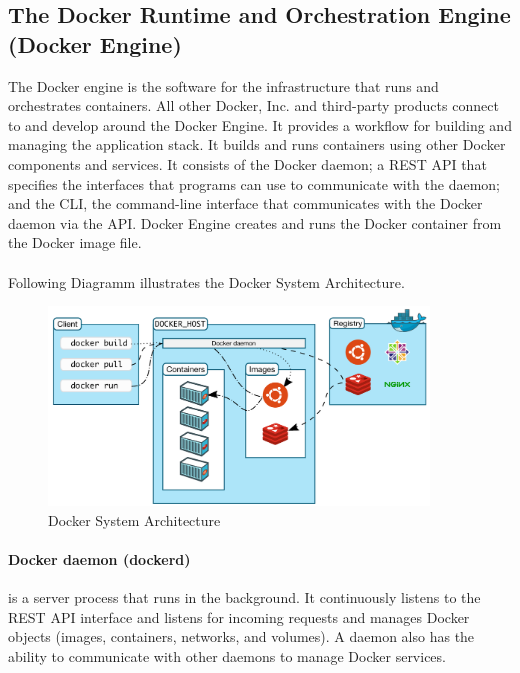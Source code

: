 		\subsection{The Docker Runtime and Orchestration Engine (Docker Engine)} 
		\label{Grundlagen:Docker:Docker Engine}
		The Docker engine is the software for the infrastructure that runs and orchestrates containers. All other Docker, Inc. and third-party products connect to and develop around the Docker Engine. It provides a workflow for building and managing the application stack. It builds and runs containers using other Docker components and services. It consists of the Docker daemon; a REST API that specifies the interfaces that programs can use to communicate with the daemon; and the CLI, the command-line interface that communicates with the Docker daemon via the API. Docker Engine creates and runs the Docker container from the Docker image file.\\
		\\
		Following Diagramm illustrates the Docker System Architecture.
		\begin{figure}[H]
			\centering
			\includegraphics[width=0.9\textwidth]{"Bilder/DockerArchitecture.png"}
			\caption{Docker System Architecture \cite{dockerOverwiew}}
			\label{fig:Background:DockerEngine:Architecture}					
		\end{figure}

		\paragraph{Docker daemon (dockerd)}  is a server process that runs
		in the background. It continuously listens to the REST API interface
		and listens for incoming requests and manages Docker objects (images, containers, networks, and volumes).  A daemon also has the ability to communicate with other daemons to manage Docker services.\cite{dockerOverwiew}

